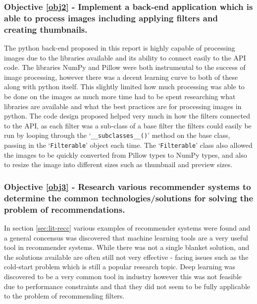 \documentclass[a4paper,12pt]{report}
\begin{document}
  \subsubsection{Objective \ref{obj2} - Implement a back-end application which is able to process images including applying filters and creating thumbnails.}
    The python back-end proposed in this report is highly capable of processing images due to the libraries available and its ability to connect easily to the API code. The libraries NumPy and Pillow were both instrumental to the success of image processing, however there was a decent learning curve to both of these along with python itself. This slightly limited how much processing was able to be done on the images as much more time had to be spent researching what libraries are available and what the best practices are for processing images in python. The code design proposed helped very much in how the filters connected to the API, as each filter was a sub-class of a base filter the filters could easily be run by looping through the ‘\texttt{\_\_subclasses\_\_()}’ method on the base class, passing in the ‘\texttt{Filterable}’ object each time. The ‘\texttt{Filterable}’ class also allowed the images to be quickly converted from Pillow types to NumPy types, and also to resize the image into different sizes such as thumbnail and preview sizes.

  \subsubsection{Objective \ref{obj3} - Research various recommender systems to determine the common technologies/solutions for solving the problem of recommendations.}
    In section \ref{sec:lit-recc} various examples of recommender systems were found and a general concensus was discovered that machine learning tools are a very useful tool in recommender systems. While there was not a single blanket solution, and the solutions available are often still not very effective - facing issues such as the cold-start problem which is still a popular research topic. Deep learning was discovered to be a very common tool in industry however this was not feasible due to performance constraints and that they did not seem to be fully applicable to the problem of recommending filters.
\end{document}
